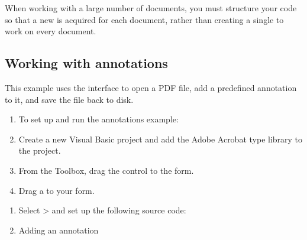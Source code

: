 \documentclass[letterpaper,12pt,english,openany,oneside]{sphinxmanual}
\begin{document}
When working with a large number of documents, you must structure your code so that a new  is acquired for each document, rather than creating a single  to work on every document.


\subsection{Working with annotations}
\label{\detokenize{IAC_DevApp_OLE_Support:working-with-annotations}}
This example uses the  interface to open a PDF file, add a predefined annotation to it, and save the file back to disk.
\begin{enumerate}
%
\item {} 
To set up and run the annotations example:

\item {} 
Create a new Visual Basic project and add the Adobe Acrobat type library to the project.

\item {} 
From the Toolbox, drag the  control to the form.

\item {} 
Drag a  to your form.

\end{enumerate}

\noindent{}
\begin{enumerate}
%
\item {} 
Select  >  and set up the following source code:

\item {} 
Adding an annotation

\end{enumerate}
\end{document}
